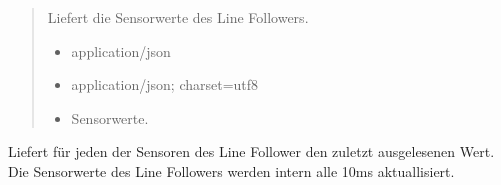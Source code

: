 \documentclass[letterpaper,10pt,english]{sphinxmanual}
\begin{document}
\begin{fulllineitems}
\label{\detokenize{agv_rest_api_linefollower:get--api-agv-linefollower-sensors}}
\pysigstartsignatures
\pysigline
{}
\pysigstopsignatures\begin{quote}\begin{description}
\sphinxAtStartPar
Liefert die Sensorwerte des Line Followers.

\begin{itemize}
\item {} 
\sphinxAtStartPar
{} \textendash{} application/json

\end{itemize}

\begin{itemize}
\item {} 
\sphinxAtStartPar
{} \textendash{} application/json; charset=utf\sphinxhyphen{}8

\end{itemize}

\begin{itemize}
\item {} 
\sphinxAtStartPar
{} \textendash{} Sensorwerte.

\end{itemize}

\end{description}\end{quote}

\end{fulllineitems}


\sphinxAtStartPar
{}
Liefert für jeden der Sensoren des Line Follower den zuletzt ausgelesenen Wert.
Die Sensorwerte des Line Followers werden intern alle 10ms aktuallisiert.

\sphinxAtStartPar
{}

\sphinxAtStartPar
{}

\sphinxAtStartPar
{}
\end{document}
